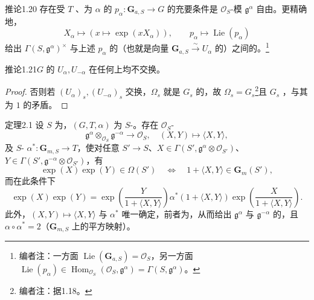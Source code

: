 \begin{SGAresult}{推论}{1.20}
存在受 $T$ 、为 $\alpha$ 的 $p_\alpha:\mathbf G_{a,S}\to G$ 的充要条件是 $\mathscr O_S$-模 $\mathfrak g^\alpha$ 自由。更精确地，
\[X_\alpha\mapsto(x\mapsto\exp(xX_\alpha)),\qquad p_\alpha\mapsto\operatorname{Lie}(p_\alpha)\]
给出 $\Gamma(S,\mathfrak g^\alpha)^\times$ 与上述 $p_\alpha$ 的（也就是向量 $\mathbf G_{a,S}\xrightarrow\sim U_\alpha$ 的）之间的。\footnote{编者注：一方面 $\operatorname{Lie}(\mathbf G_{a,S})=\mathscr O_S$，另一方面 $\operatorname{Lie}(p_\alpha)\in\operatorname{Hom}_{\mathscr O_S}(\mathscr O_S,\mathfrak g^\alpha)=\Gamma(S,\mathfrak g^\alpha)$。}
\end{SGAresult}
\begin{SGAresult}{推论}{1.21}$G$ 的 $U_\alpha,U_{-\alpha}$ 在任何上均不交换。\end{SGAresult}
\begin{proof}
否则若 $(U_\alpha)_s,(U_{-\alpha})_s$ 交换，$\Omega_s$ 就是 $G_s$ 的，故 $\Omega_s=G_s$\footnote{编者注：据1.18。}且 $G_s$ ，与其为 $1$ 的矛盾。
\end{proof}
\begin{SGAresult}{定理}{2.1}
设 $S$ 为，$(G,T,\alpha)$ 为 $S$-。存在 $\mathscr O_S$-
\[\mathfrak g^\alpha\otimes_{\mathscr O_S}\mathfrak g^{-\alpha}\longrightarrow\mathscr O_S,\quad(X,Y)\longmapsto\langle X,Y\rangle,\]
及 $S$- $\alpha^*:\mathbf G_{m,S}\to T$，使对任意 $S'\to S$、$X\in\Gamma(S',\mathfrak g^\alpha\otimes\mathscr O_{S'})$、$Y\in\Gamma(S',\mathfrak g^{-\alpha}\otimes\mathscr O_{S'})$，有
\[\exp(X)\exp(Y)\in\Omega(S')\quad\Longleftrightarrow\quad1+\langle X,Y\rangle\in\mathbf G_m(S'),\]
而在此条件下
\[\exp(X)\exp(Y)=\exp\left(\frac Y{1+\langle X,Y\rangle}\right)\alpha^*(1+\langle X,Y\rangle)\exp\left(\frac X{1+\langle X,Y\rangle}\right).\tag{F}\]
此外，$(X,Y)\mapsto\langle X,Y\rangle$ 与 $\alpha^*$ 唯一确定，前者为，从而给出 $\mathfrak g^\alpha$ 与 $\mathfrak g^{-\alpha}$ 的，且 $\alpha\circ\alpha^*=2$（$\mathbf G_{m,S}$ 上的平方映射）。
\end{SGAresult}

